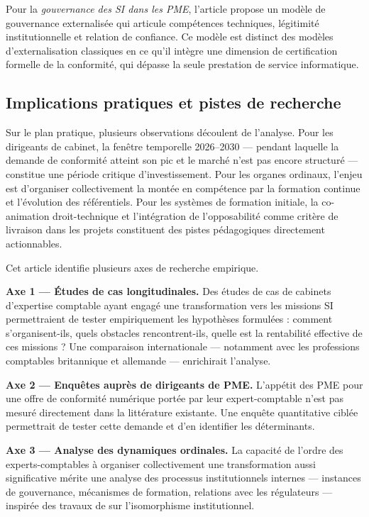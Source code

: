 \documentclass[12pt,a4paper]{article}
\begin{document}
Pour la \textit{gouvernance des SI dans les PME}, l'article propose un modèle de gouvernance externalisée qui articule compétences techniques, légitimité institutionnelle et relation de confiance. Ce modèle est distinct des modèles d'externalisation classiques en ce qu'il intègre une dimension de certification formelle de la conformité, qui dépasse la seule prestation de service informatique.

\subsection{Implications pratiques et pistes de recherche}

Sur le plan pratique, plusieurs observations découlent de l'analyse. Pour les dirigeants de cabinet, la fenêtre temporelle 2026--2030 — pendant laquelle la demande de conformité atteint son pic et le marché n'est pas encore structuré — constitue une période critique d'investissement. Pour les organes ordinaux, l'enjeu est d'organiser collectivement la montée en compétence par la formation continue et l'évolution des référentiels. Pour les systèmes de formation initiale, la co-animation droit-technique et l'intégration de l'opposabilité comme critère de livraison dans les projets constituent des pistes pédagogiques directement actionnables.

Cet article identifie plusieurs axes de recherche empirique.

\textbf{Axe 1 — Études de cas longitudinales.} Des études de cas de cabinets d'expertise comptable ayant engagé une transformation vers les missions SI permettraient de tester empiriquement les hypothèses formulées : comment s'organisent-ils, quels obstacles rencontrent-ils, quelle est la rentabilité effective de ces missions ? Une comparaison internationale — notamment avec les professions comptables britannique et allemande — enrichirait l'analyse.

\textbf{Axe 2 — Enquêtes auprès de dirigeants de PME.} L'appétit des PME pour une offre de conformité numérique portée par leur expert-comptable n'est pas mesuré directement dans la littérature existante. Une enquête quantitative ciblée permettrait de tester cette demande et d'en identifier les déterminants.

\textbf{Axe 3 — Analyse des dynamiques ordinales.} La capacité de l'ordre des experts-comptables à organiser collectivement une transformation aussi significative mérite une analyse des processus institutionnels internes — instances de gouvernance, mécanismes de formation, relations avec les régulateurs — inspirée des travaux de \textcite{dimaggio1983} sur l'isomorphisme institutionnel.
\end{document}
